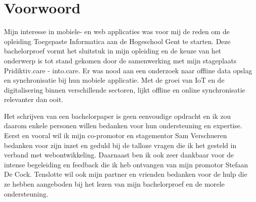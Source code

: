 
\chapter*{Voorwoord}
\label{ch:voorwoord}


Mijn interesse in mobiele- en web applicaties was voor mij de reden om de opleiding Toegepaste Informatica aan de Hogeschool Gent te starten. Deze bachelorproef vormt het sluitstuk in mijn opleiding en de keuze van het onderwerp is tot stand gekomen door de samenwerking met mijn stageplaats Pridiktiv.care - into.care. Er was nood aan een onderzoek naar offline data opslag en synchronisatie bij hun mobiele applicatie. Met de groei van IoT en de digitalisering binnen verschillende sectoren, lijkt offline en online synchronisatie relevanter dan ooit.

Het schrijven van een bachelorpaper is geen eenvoudige opdracht en ik zou daarom enkele personen willen bedanken voor hun ondersteuning en expertise. Eerst en vooral wil ik mijn co-promotor en stagementor Sam Verschueren bedanken voor zijn inzet en geduld bij de talloze vragen die ik het gesteld in verband met webontwikkeling. Daarnaast ben ik ook zeer dankbaar voor de intense begeleiding en feedback die ik heb ontvangen van mijn promotor Stefaan De Cock. Tenslotte wil ook mijn partner en vrienden bedanken voor de hulp die ze hebben aangeboden bij het lezen van mijn bachelorproef en de morele ondersteuning.